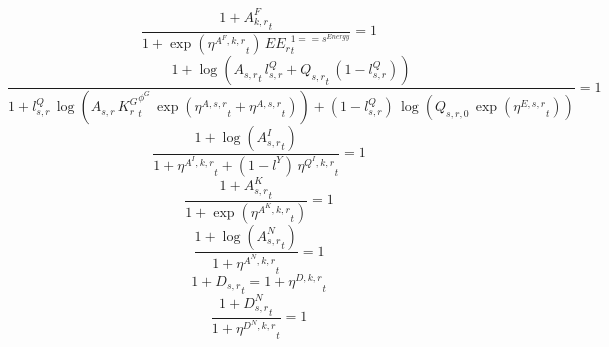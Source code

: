 \noindent[name= `sector TFP final demand 1 1']
\begin{dmath}
\frac{1+{{A^{F}_{k,r}}}_{t}}{1+\exp\left({{\eta^{A^F,k,r}}}_{t}\right)\, {{EE_r}}_{t}^{1=={{s^{Energy}}}}}=1
\end{dmath}
\noindent[name= `sector TFP 1 1']
\begin{dmath}
\frac{1+\log\left({{A_{s,r}}}_{t}\, {{l^{Q}_{s,r}}}+{{Q_{s,r}}}_{t}\, \left(1-{{l^{Q}_{s,r}}}\right)\right)}{1+{{l^{Q}_{s,r}}}\, \log\left({{A_{s,r}}}\, {{K^G_{r}}}_{t}^{{{\phi^{G}}}}\, \exp\left({{\eta^{A,s,r}}}_{t}+{{\eta^{A,s,r}}}_{t}\right)\right)+\left(1-{{l^{Q}_{s,r}}}\right)\, \log\left({{Q_{s,r,0}}}\, \exp\left({{\eta^{E,s,r}}}_{t}\right)\right)}=1
\end{dmath}
\noindent[name= `intermediate input productivity 1 1']
\begin{dmath}
\frac{1+\log\left({{A^{I}_{s,r}}}_{t}\right)}{1+{{\eta^{A^{I},k,r}}}_{t}+\left(1-{{l^{Y}}}\right)\, {{\eta^{Q^{I},k,r}}}_{t}}=1
\end{dmath}
\noindent[name= `capital productivity shock 1 1']
\begin{dmath}
\frac{1+{{A^{K}_{s,r}}}_{t}}{1+\exp\left({{\eta^{A^{K},k,r}}}_{t}\right)}=1
\end{dmath}
\noindent[name= `labour productivity shock 1 1']
\begin{dmath}
\frac{1+\log\left({{A^{N}_{s,r}}}_{t}\right)}{1+{{\eta^{A^{N},k,r}}}_{t}}=1
\end{dmath}
\noindent[name= `TFP damage 1 1']
\begin{dmath}
1+{{D_{s,r}}}_{t}=1+{{\eta^{D,k,r}}}_{t}
\end{dmath}
\noindent[name= `labour damage 1 1']
\begin{dmath}
\frac{1+{{D^N_{s,r}}}_{t}}{1+{{\eta^{D^{N},k,r}}}_{t}}=1
\end{dmath}
\noindent[name= `capital damage 1 1']
